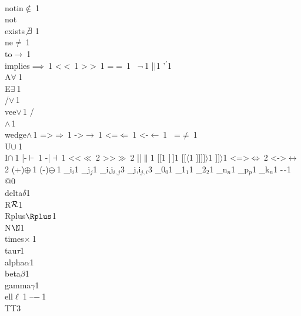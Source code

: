 {        {\\notin}{{$\notin\ $}}1
        {\\not\\exists}{{$\not\exists\ $}}1
        {\\ne}{{$\ne\ $}}1
        {\\to}{{$\to\ $}}1
        {\\implies}{{$\implies\ $}}1
        {<}{{$<\ $}}1
        {>}{{$>\ $}}1
        {=}{{$=\ $}}1
        {~}{{$\neg\ $}}1
        {|}{{$\mid$}}1
        {'}{{$^\prime$}}1
        {\\A}{{$\forall\ $}}1
        {\\E}{{$\exists\ $}}1
        {\\/}{{$\vee\,$}}1
        {\\vee}{{$\vee\,$}}1
        {/\\}{{$\wedge\,$}}1
        {\\wedge}{{$\wedge\,$}}1
        {=>}{{$\Rightarrow\ $}}1
        {->}{{$\rightarrow\ $}}1
        {<=}{{$\Leftarrow\ $}}1
        {<-}{{$\leftarrow\ $}}1
        {~=}{{$\neq\ $}}1
        {\\U}{{$\cup\ $}}1
        {\\I}{{$\cap\ $}}1
        {|-}{{$\vdash\ $}}1
        {-|}{{$\dashv\ $}}1
        {<<}{{$\ll\ $}}2
        {>>}{{$\gg\ $}}2
        {||}{{$\|$}}1
        {[}{{$[$}}1
        {]}{{$\,]$}}1
        {[[}{{$\langle$}}1
        {]]]}{{$]\rangle$}}1
        {]]}{{$\rangle$}}1
        {<=>}{{$\Leftrightarrow\ $}}2
        {<->}{{$\leftrightarrow\ $}}2
        {(+)}{{$\oplus\ $}}1
        {(-)}{{$\ominus\ $}}1
        {_i}{{$_{i}$}}1
        {_j}{{$_{j}$}}1
        {_{i,j}}{{$_{i,j}$}}3
        {_{j,i}}{{$_{j,i}$}}3
        {_0}{{$_0$}}1
        {_1}{{$_1$}}1
        {_2}{{$_2$}}1
        {_n}{{$_n$}}1
        {_p}{{$_p$}}1
        {_k}{{$_n$}}1
        {-}{{$\ms{-}$}}1
        {@}{{}}0
        {\\delta}{{$\delta$}}1
        {\\R}{{$\R$}}1
        {\\Rplus}{{$\Rplus$}}1
        {\\N}{{$\N$}}1
        {\\times}{{$\times\ $}}1
        {\\tau}{{$\tau$}}1
        {\\alpha}{{$\alpha$}}1
        {\\beta}{{$\beta$}}1
        {\\gamma}{{$\gamma$}}1
        {\\ell}{{$\ell\ $}}1
        {--}{{$-\ $}}1
        {\\TT}{{\hspace{1.5em}}}3        
      }

